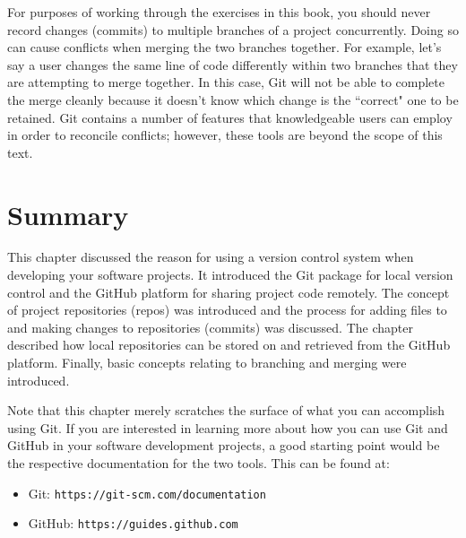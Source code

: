 \documentclass{book}
\begin{document}
For purposes of working through the exercises in this book, you should never record changes (commits) to multiple branches of a project concurrently. Doing so can cause conflicts when merging the two branches together. For example, let's say a user changes the same line of code differently within two branches that they are attempting to merge together. In this case, Git will not be able to complete the merge cleanly because it doesn't know which change is the ``correct" one to be retained. Git contains a number of features that knowledgeable users can employ in order to reconcile conflicts; however, these tools are beyond the scope of this text.

\section{Summary}
This chapter discussed the reason for using a version control system when developing your software projects. It introduced the Git package for local version control and the GitHub platform for sharing project code remotely. The concept of project repositories (repos) was introduced and the process for adding files to and making changes to repositories (commits) was discussed. The chapter described how local repositories can be stored on and retrieved from the GitHub platform. Finally, basic concepts relating to branching and merging were introduced.

Note that this chapter merely scratches the surface of what you can accomplish using Git. If you are interested in learning more about how you can use Git and GitHub in your software development projects, a good starting point would be the respective documentation for the two tools. This can be found at:

\begin{itemize}
	\item Git: \texttt{https://git-scm.com/documentation}
	\item GitHub: \texttt{https://guides.github.com}
\end{itemize}
\end{document}
